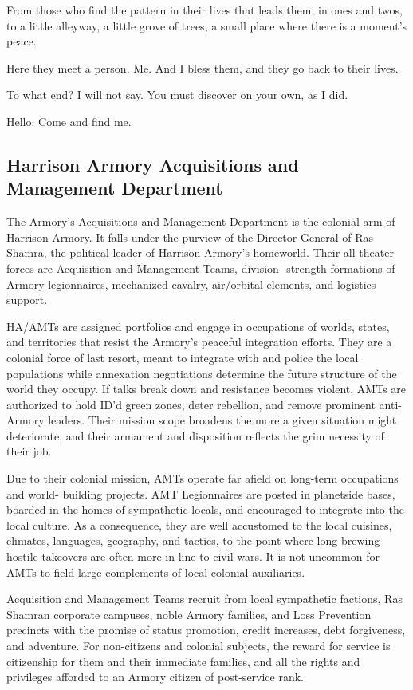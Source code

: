 {From those who find the pattern in their lives that leads them, in ones and twos, to a little
alleyway, a little grove of trees, a small place where there is a moment’s peace.

Here they meet a person. Me. And I bless them, and they go back to their lives.

To what end? I will not say. You must discover on your own, as I did.

Hello. Come and find me.}

\subsection{Harrison Armory Acquisitions and Management Department}

The Armory’s Acquisitions and Management Department is the colonial arm of Harrison Armory.
It falls under the purview of the Director-General of Ras Shamra, the political leader of Harrison
Armory’s homeworld. Their all-theater forces are Acquisition and Management Teams, division-
strength formations of Armory legionnaires, mechanized cavalry, air/orbital elements, and
logistics support.

HA/AMTs are assigned portfolios and engage in occupations of worlds, states, and territories
that resist the Armory’s peaceful integration efforts. They are a colonial force of last resort, meant
to integrate with and police the local populations while annexation negotiations determine the
future structure of the world they occupy. If talks break down and resistance becomes violent,
AMTs are authorized to hold ID’d green zones, deter rebellion, and remove prominent anti-
Armory leaders. Their mission scope broadens the more a given situation might deteriorate, and
their armament and disposition reflects the grim necessity of their job.

Due to their colonial mission, AMTs operate far afield on long-term occupations and world-
building projects. AMT Legionnaires are posted in planetside bases, boarded in the homes of
sympathetic locals, and encouraged to integrate into the local culture. As a consequence, they
are well accustomed to the local cuisines, climates, languages, geography, and tactics, to the
point where long-brewing hostile takeovers are often more in-line to civil wars. It is not
uncommon for AMTs to field large complements of local colonial auxiliaries.

Acquisition and Management Teams recruit from local sympathetic factions, Ras Shamran
corporate campuses, noble Armory families, and Loss Prevention precincts with the promise of
status promotion, credit increases, debt forgiveness, and adventure. For non-citizens and
colonial subjects, the reward for service is citizenship for them and their immediate families, and
all the rights and privileges afforded to an Armory citizen of post-service rank.

